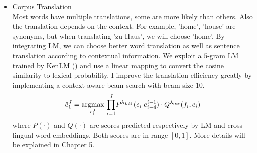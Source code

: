 \begin{itemize}
	\item Corpus Translation\\
	Most words have multiple translations, some are more likely than others. Also the translation depends on the context. For example, 'home', 'house' are synonyms, but when translating 'zu Haus', we will choose 'home'. By integrating LM, we can choose better word translation as well as sentence translation according to contextual information. We exploit a $5$-gram LM trained by KenLM (\cite{heafield2011kenlm}) and use a linear mapping to convert the cosine similarity to lexical probability. I improve the translation efficiency greatly by implementing a context-aware beam search with beam size 10. 
		\[ \hat{e}_1^J = \underset{e_1^J}{\operatorname{argmax}}{\ \prod_{i=1}^{J}} {P^{\lambda_{LM}}(e_i|e_{i-4}^{i-1}) \cdot Q^{\lambda_{lex}}(f_i,e_i)}\]
		where $P(\cdot)$ and $Q(\cdot)$ are scores predicted respectively by LM and cross-lingual word embeddings. Both scores are in range $[0,1]$. 
	More details will be explained in Chapter 5.
	




\end{itemize}
